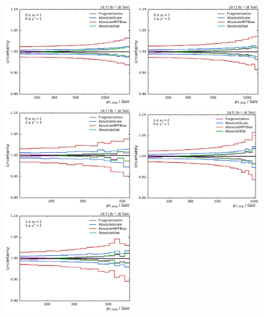 \begin{figure}[h!tbp]
    \centering
    \includegraphics[width=0.49\textwidth]{figures/measurement/jec_relunc_0_yb0ys0.pdf}\hfill
    \includegraphics[width=0.49\textwidth]{figures/measurement/jec_relunc_0_yb0ys1.pdf}
    \includegraphics[width=0.49\textwidth]{figures/measurement/jec_relunc_0_yb0ys2.pdf}\hfill
    \includegraphics[width=0.49\textwidth]{figures/measurement/jec_relunc_0_yb1ys0.pdf}
    \includegraphics[width=0.49\textwidth]{figures/measurement/jec_relunc_0_yb1ys1.pdf}\hfill

\end{figure}
